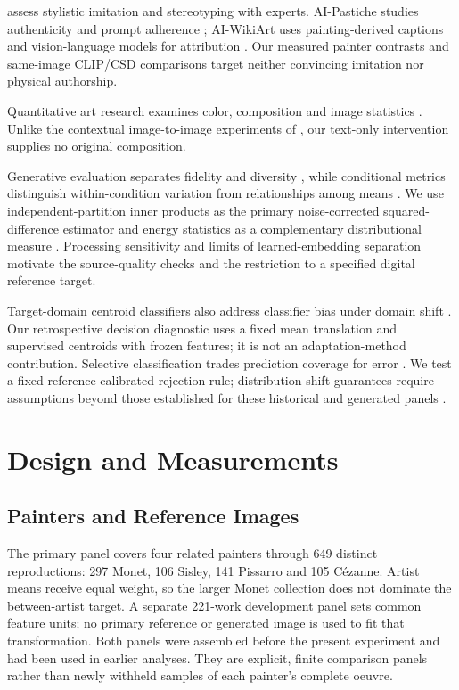 \citet{deliege2025} assess stylistic imitation and stereotyping with experts.
AI-Pastiche studies authenticity and prompt adherence \citep{asperti2025pastiche};
AI-WikiArt uses painting-derived captions and vision-language models for
attribution \citep{fu2025aiwikiart}. Our measured painter contrasts and same-image
CLIP/CSD comparisons target neither convincing imitation nor physical authorship.

Quantitative art research examines color, composition and image statistics
\citep{kim2014,sigaki2018,lee2020}. Unlike the contextual image-to-image
experiments of \citet{kim2026}, our text-only intervention supplies no original
composition.

Generative evaluation separates fidelity and diversity \citep{naeem2020},
while conditional metrics distinguish within-condition variation from relationships
among means \citep{benny2021conditional}. We use independent-partition inner products
as the primary noise-corrected squared-difference estimator \citep{diedrichsen2017representational}
and energy statistics as a complementary distributional measure \citep{szekely2013}.
Processing sensitivity \citep{parmar2022} and limits of learned-embedding
separation \citep{asperti2026} motivate the source-quality checks and the
restriction to a specified digital reference target.

Target-domain centroid classifiers also address classifier bias under domain
shift \citep{liang2021atdoc}. Our retrospective decision diagnostic uses a fixed
mean translation and supervised centroids with frozen features; it is not an
adaptation-method contribution.
Selective classification trades prediction coverage for error
\citep{geifman2017selective}. We test a fixed reference-calibrated rejection rule;
distribution-shift guarantees require assumptions beyond those established for
these historical and generated panels \citep{tibshirani2019shift}.

\section{Design and Measurements}\label{sec:design}
\subsection{Painters and Reference Images}
The primary panel covers four related painters through 649 distinct reproductions: 297 Monet,
106 Sisley, 141 Pissarro and 105 C\'ezanne. Artist means receive equal weight,
so the larger Monet collection does not dominate the between-artist target.
A separate 221-work development panel sets common feature units; no primary
reference or generated image is used to fit that transformation. Both panels
were assembled before the present experiment and had been used in earlier
analyses. They are explicit, finite comparison panels rather than newly withheld
samples of each painter's complete oeuvre.

